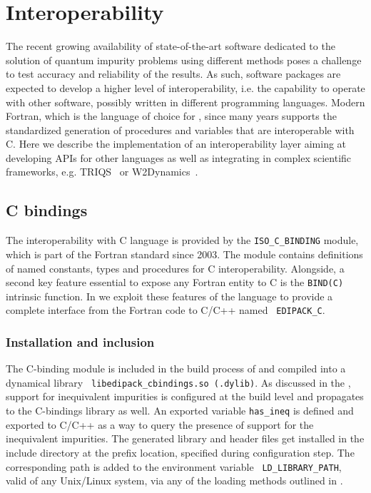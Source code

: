 \documentclass[edipack_sp.tex]{subfiles}
\begin{document}
\section{Interoperability}\label{SecInterop}
The recent growing availability of state-of-the-art software dedicated
to the solution of quantum impurity problems using different methods \cite{Bulla2008RMP,Parcollet2015CPC,Seth2016CPC,Bauernfeind2017PRX,Ganahl2015PRB,Wallerberger2019CPC,Mejuto-Zaera2020PRB}
poses a challenge to test accuracy and reliability of the
results.
As such, software packages are expected to develop a higher level of interoperability, i.e. the capability to operate with other software, possibly written in different programming languages.
Modern Fortran, which is the language of choice for \NAME, since many
years supports the standardized generation of procedures and
variables that are interoperable with C.
Here we describe the implementation of an interoperability layer aiming at developing APIs for other languages as well as 
integrating \NAME in complex scientific frameworks, e.g. TRIQS~\cite{Parcollet2015CPC} or W2Dynamics~\cite{Wallerberger2019CPC}. 

\subsection{C bindings}\label{sSecInteropCbindings}
The interoperability with C language is provided by the
{\tt ISO\_C\_BINDING} module, which is part of the Fortran
standard since 2003\cite{Reid2003CISE,Reid2007SFF}. The module contains definitions of named
constants, types and procedures for C interoperability.
Alongside, a second key feature essential to expose any Fortran entity to C is the {\tt BIND(C)} intrinsic function.
In \NAME we exploit these features of the language to provide a
complete interface from the Fortran code to C/C++ named {\tt
  EDIPACK\_C}. 


\subsubsection{Installation and inclusion}\label{sSecInteropCbindingsInstallation}
The C-binding module is included in the build process of \NAME and
compiled into a dynamical library {\tt
  libedipack\_cbindings.so (.dylib)}. As discussed in the
, support for inequivalent
impurities is configured at the build level and propagates to the
C-bindings library as well. An exported variable {\tt has\_ineq} is
defined and exported to C/C++ as a way to query the presence of support for the inequivalent impurities. 
The generated library and header files get installed in the include
directory at the prefix location, specified during configuration
step. The corresponding path is added to the environment variable {\tt
  LD\_LIBRARY\_PATH}, valid of any Unix/Linux system, via any of the
loading methods outlined in . 
\end{document}
